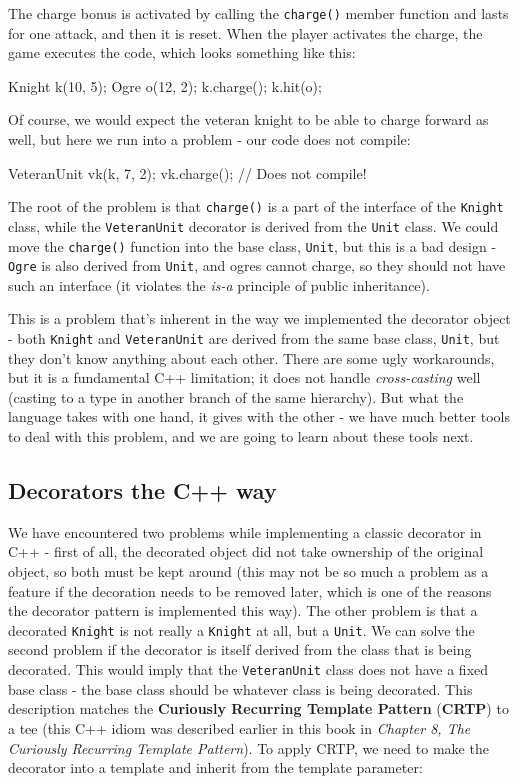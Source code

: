 The charge bonus is activated by calling the \texttt{charge()} member function and lasts for one attack, and then it is reset. When the player activates the charge, the game executes the code, which looks something like this:

\begin{code}
Knight k(10, 5);
Ogre o(12, 2);
k.charge();
k.hit(o);
\end{code}

Of course, we would expect the veteran knight to be able to charge forward as well, but here we run into a problem - our code does not compile:

\begin{code}
VeteranUnit vk(k, 7, 2);
vk.charge(); // Does not compile!
\end{code}

The root of the problem is that \texttt{charge()} is a part of the interface of the \texttt{Knight} class, while the \texttt{VeteranUnit} decorator is derived from the \texttt{Unit} class. We could move the \texttt{charge()} function into the base class, \texttt{Unit}, but this is a bad design - \texttt{Ogre} is also derived from \texttt{Unit}, and ogres cannot charge, so they should not have such an interface (it violates the \emph{is-a} principle of public inheritance).

This is a problem that's inherent in the way we implemented the decorator object - both \texttt{Knight} and \texttt{VeteranUnit} are derived from the same base class, \texttt{Unit}, but they don't know anything about each other. There are some ugly workarounds, but it is a fundamental C++ limitation; it does not handle \emph{cross-casting} well (casting to a type in another branch of the same hierarchy). But what the language takes with one hand, it gives with the other - we have much better tools to deal with this problem, and we are going to learn about these tools next.

\subsection{Decorators the C++ way}

We have encountered two problems while implementing a classic decorator in C++ - first of all, the decorated object did not take ownership of the original object, so both must be kept around (this may not be so much a problem as a feature if the decoration needs to be removed later, which is one of the reasons the decorator pattern is implemented this way). The other problem is that a decorated \texttt{Knight} is not really a \texttt{Knight} at all, but a \texttt{Unit}. We can solve the second problem if the decorator is itself derived from the class that is being decorated. This would imply that the \texttt{VeteranUnit} class does not have a fixed base class - the base class should be whatever class is being decorated. This description matches the \textbf{Curiously Recurring Template Pattern} (\textbf{CRTP}) to a tee (this C++ idiom was described earlier in this book in \emph{Chapter 8, The Curiously Recurring Template Pattern}). To apply CRTP, we need to make the decorator into a template and inherit from the template parameter:

